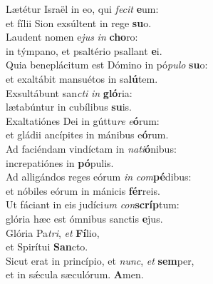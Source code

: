 \evenverse Lætétur Israël in eo, qui \textit{fe}\textit{cit} \textbf{e}um:~\*\\
\evenverse et fílii Sion exsúltent in rege \textbf{su}o.\\
\oddverse Laudent nomen e\textit{jus} \textit{in} \textbf{cho}ro:~\*\\
\oddverse in týmpano, et psaltério psallant \textbf{e}i.\\
\evenverse Quia beneplácitum est Dómino in pó\textit{pu}\textit{lo} \textbf{su}o:~\*\\
\evenverse et exaltábit mansuétos in sa\textbf{lú}tem.\\
\oddverse Exsultábunt san\textit{cti} \textit{in} \textbf{gló}ria:~\*\\
\oddverse lætabúntur in cubílibus \textbf{su}is.\\
\evenverse Exaltatiónes Dei in gúttu\textit{re} \textit{e}\textbf{ó}rum:~\*\\
\evenverse et gládii ancípites in mánibus e\textbf{ó}rum.\\
\oddverse Ad faciéndam vindíctam in \textit{na}\textit{ti}\textbf{ó}nibus:~\*\\
\oddverse increpatiónes in \textbf{pó}pulis.\\
\evenverse Ad alligándos reges eórum \textit{in} \textit{com}\textbf{pé}dibus:~\*\\
\evenverse et nóbiles eórum in mánicis \textbf{fér}reis.\\
\oddverse Ut fáciant in eis judíci\textit{um} \textit{con}\textbf{scríp}tum:~\*\\
\oddverse glória hæc est ómnibus sanctis \textbf{e}jus.\\
\evenverse Glória Pa\textit{tri}, \textit{et} \textbf{Fí}lio,~\*\\
\evenverse et Spirítui \textbf{San}cto.\\
\oddverse Sicut erat in princípio, et \textit{nunc}, \textit{et} \textbf{sem}per,~\*\\
\oddverse et in sǽcula sæculórum. \textbf{A}men.\\
